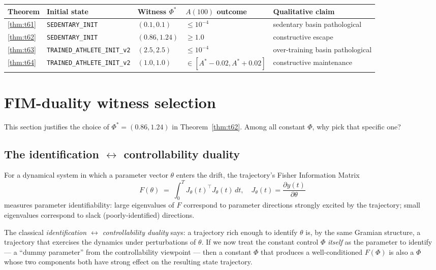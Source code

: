 \documentclass[11pt,a4paper]{article}
\theoremstyle{definition}
\begin{document}
\begin{center}\small
\begin{tabular}{lllll}
\toprule
Theorem & Initial state & Witness $\Phi^*$ & $A(100)$ outcome & Qualitative claim \\
\midrule
\ref{thm:t61} & \texttt{SEDENTARY\_INIT}        & $(0.1, 0.1)$  & $\le 10^{-4}$         & sedentary basin pathological \\
\ref{thm:t62} & \texttt{SEDENTARY\_INIT}        & $(0.86, 1.24)$& $\ge 1.0$             & constructive escape \\
\ref{thm:t63} & \texttt{TRAINED\_ATHLETE\_INIT\_v2} & $(2.5, 2.5)$ & $\le 10^{-4}$       & over-training basin pathological \\
\ref{thm:t64} & \texttt{TRAINED\_ATHLETE\_INIT\_v2} & $(1.0, 1.0)$ & $\in [A^* - 0.02, A^* + 0.02]$ & constructive maintenance \\
\bottomrule
\end{tabular}
\end{center}

\section{FIM-duality witness selection} \label{sec:fim-witness}

This section justifies the choice of $\Phi^* = (0.86, 1.24)$ in Theorem~\ref{thm:t62}. Among all constant $\Phi$, why pick that specific one?

\subsection{The identification $\leftrightarrow$ controllability duality}

For a dynamical system in which a parameter vector $\theta$ enters the drift, the trajectory's Fisher Information Matrix
\[
F(\theta) \;=\; \int_0^T J_\theta(t)^\top J_\theta(t) \, dt, \quad J_\theta(t) = \frac{\partial y(t)}{\partial \theta}
\]
measures parameter identifiability: large eigenvalues of $F$ correspond to parameter directions strongly excited by the trajectory; small eigenvalues correspond to slack (poorly-identified) directions.

The classical \emph{identification $\leftrightarrow$ controllability duality} says: a trajectory rich enough to identify $\theta$ is, by the same Gramian structure, a trajectory that exercises the dynamics under perturbations of $\theta$. If we now treat the constant control $\Phi$ \emph{itself} as the parameter to identify — a ``dummy parameter'' from the controllability viewpoint — then a constant $\Phi$ that produces a well-conditioned $F(\Phi)$ is also a $\Phi$ whose two components both have strong effect on the resulting state trajectory.
\end{document}
